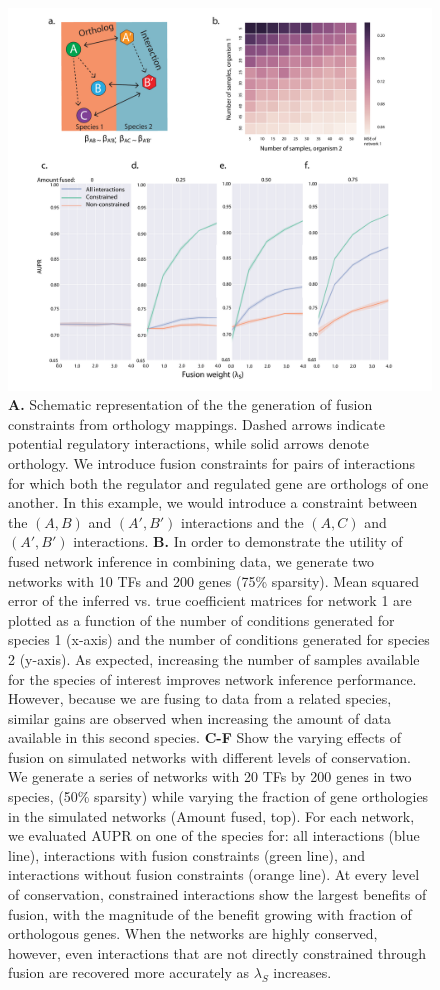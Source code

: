 \documentclass[11pt]{article}
\begin{document}
\begin{figure}
\begin{center}
  \includegraphics[scale=0.45]{fig1.pdf}
  \caption{\label{fusion} \textbf{A.} Schematic representation of the the generation of fusion constraints from orthology mappings. Dashed arrows indicate potential regulatory interactions, while solid arrows denote orthology. We introduce fusion constraints for pairs of interactions for which both the regulator and regulated gene are orthologs of one another. 
  In this example, we would introduce a constraint between the $(A, B)$ and $(A', B')$ interactions and the $(A, C)$ and $(A', B')$ interactions. \textbf{B.} 
  In order to demonstrate the utility of fused network inference in combining data, we generate two networks with 10 TFs and 200 genes (75\% sparsity). Mean squared error of the inferred vs. true coefficient matrices for network 1 are plotted as a function of the number of conditions generated for species 1 (x-axis) and the number of conditions generated for species 2 (y-axis). 
  As expected, increasing the number of samples available for the species of interest improves network inference performance. 
  However, because we are fusing to data from a related species, similar gains are observed when increasing the amount of data available in this second species. 
  \textbf{C-F} Show the varying effects of fusion on simulated networks with different levels of conservation. We generate a series of networks with 20 TFs by 200 genes in two species, (50\% sparsity) while varying the fraction of gene orthologies in the simulated networks (Amount fused, top). For each network, we evaluated AUPR on one of the species for: all interactions (blue line), interactions with fusion constraints (green line), and interactions without fusion constraints (orange line). At every level of conservation, constrained interactions show the largest benefits of fusion, with the magnitude of the benefit growing with fraction of orthologous genes. 
  When the networks are highly conserved, however, even interactions that are not directly constrained through fusion are recovered more accurately as $\lambda_S$ increases.}
\end{center}
\end{figure}
\end{document}
